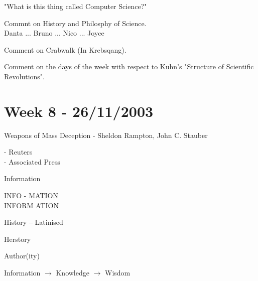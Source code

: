 \documentclass[a4paper,12pt]{article}
\begin{document}
\noindent "What is this thing called Computer Science?"

\vspace{10mm}

\noindent Commnt on History and Philosphy of Science. \\

Danta ... Bruno ... Nico ... Joyce

\vspace{10mm}

\noindent Comment on Crabwalk (In Krebsqang).

\vspace{10mm}

\noindent Comment on the days of the week with respect to Kuhn's
"Structure of Scientific Revolutions".


\section*{Week 8 - 26/11/2003}

Weapons of Mass Deception - Sheldon Rampton, John C. Stauber

\vspace{10mm}

\noindent - Reuters \\
\noindent - Associated Press

\vspace{10mm}

\noindent Information

\vspace{5mm}

\noindent INFO - MATION \\
\noindent INFORM ATION

\vspace{10mm}

\noindent History -- Latinised

\vspace{5mm}

\noindent Herstory

\vspace{10mm}

\noindent Author(ity)

\vspace{10mm}

\noindent Information $\to$ Knowledge $\to$ Wisdom
\end{document}
